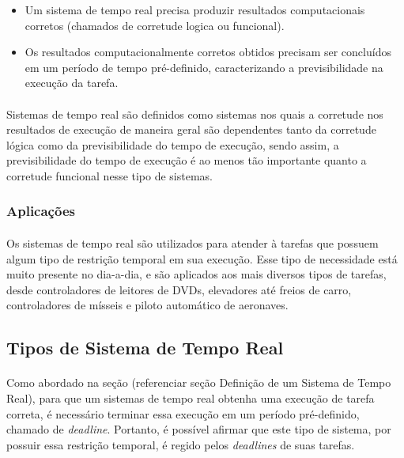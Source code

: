 \begin{itemize}
\item Um sistema de tempo real precisa produzir resultados computacionais corretos
(chamados de corretude logica ou funcional).
\item Os resultados computacionalmente corretos obtidos precisam ser concluídos em
um período de tempo pré-definido, caracterizando a previsibilidade na execução da tarefa.
\end{itemize}

\paragraph{}
Sistemas de tempo real são definidos como sistemas nos quais a corretude nos
resultados de execução de maneira geral são dependentes tanto da corretude
lógica como da previsibilidade do tempo de execução, sendo assim, a previsibilidade
do tempo de execução é ao menos tão importante quanto a corretude funcional
nesse tipo de sistemas.~\cite{Li:2003:RCE:829584}

\subsubsection{Aplicações}
\paragraph{}
Os sistemas de tempo real são utilizados para atender à tarefas que possuem algum tipo
de restrição temporal em sua execução. Esse tipo de necessidade está muito presente no
dia-a-dia, e são aplicados aos mais diversos tipos de tarefas, desde controladores de
leitores de DVDs, elevadores até freios de carro, controladores de mísseis e piloto automático
de aeronaves.

\subsection{Tipos de Sistema de Tempo Real}
\paragraph{}
Como abordado na seção (referenciar seção Definição de um Sistema de Tempo Real),
para que um sistemas de tempo real obtenha uma execução de tarefa correta,
é necessário terminar essa execução em um período pré-definido, chamado de \textit{deadline}.
Portanto, é possível afirmar que este tipo de sistema, por possuir essa restrição temporal,
é regido pelos \textit{deadlines} de suas tarefas.
